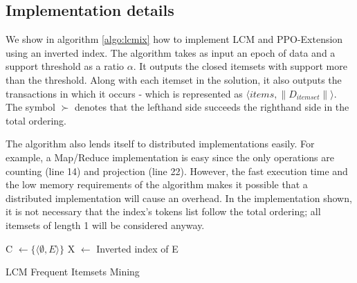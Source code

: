\documentclass{sig-alternate}
\begin{document}
\subsection{Implementation details}
We show in algorithm \ref{algo:lcmix} how to implement LCM and PPO-Extension using an inverted index. The algorithm takes as input an epoch of data and a support threshold as a ratio $\alpha$. It outputs the closed itemsets with support more than the threshold. Along with each itemset in the solution, it also outputs the transactions in which it occurs - which is represented as $\langle items, \|D_{itemset}\| \rangle$. The symbol $\succ$ denotes that the lefthand side  succeeds the righthand side in the total ordering.

The algorithm also lends itself to distributed implementations easily. For example, a Map/Reduce implementation is easy since the only operations are counting (line 14) and projection (line 22). However, the fast execution time and the low memory requirements of the algorithm makes it possible that a distributed implementation will cause an overhead. In the implementation shown, it is not necessary that the index's tokens list follow the total ordering; all itemsets of length 1 will be considered anyway. 

\begin{algorithm}
\SetAlgoLined
\LinesNumbered
{}

C $\gets \{\langle \emptyset, E\rangle\}$ 
X $\gets$ Inverted index of E\;
\;


\caption{LCM Frequent Itemsets Mining}
\label{algo:lcmix}
\end{algorithm}
\end{document}
